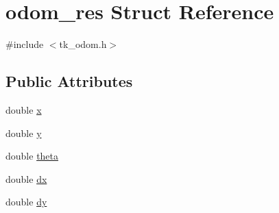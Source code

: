 \hypertarget{structodom__res}{\section{odom\-\_\-res Struct Reference}
\label{structodom__res}
}


{\ttfamily \#include $<$tk\-\_\-odom.\-h$>$}

\subsection*{Public Attributes}
\begin{DoxyCompactItemize}
\item 
double \hyperlink{structodom__res_a60afe2ad94e3c314eeffb0a063428b01}{x}
\item 
double \hyperlink{structodom__res_a74ab1edf7b0122c94377a32779834e5f}{y}
\item 
double \hyperlink{structodom__res_a1d410479a6e91c2e919749d15b7f2a7f}{theta}
\item 
double \hyperlink{structodom__res_a250da3293782566b13c36dea857daae4}{dx}
\item 
double \hyperlink{structodom__res_ad7a86edbf53b1a7ef27936157c86f9b6}{dy}
\end{DoxyCompactItemize}


